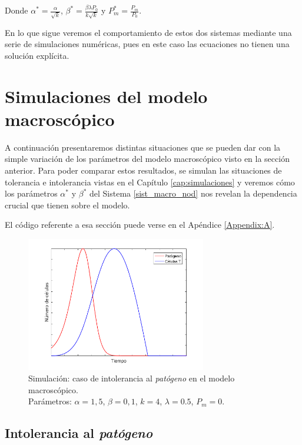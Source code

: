 Donde $\alpha^{*} = \frac{\alpha}{\sqrt k}$, $\beta^{*} = \frac{\beta \lambda P_0}{k \sqrt k}$ y $P_{m}^{*} = \frac{P_m}{P_0}$.

En lo que sigue veremos el comportamiento de estos dos sistemas mediante una serie de simulaciones numéricas, pues en este caso las ecuaciones no tienen una solución explícita.

\section{Simulaciones del modelo macroscópico}

A continuación presentaremos distintas situaciones que se pueden dar con la simple variación de los parámetros del modelo macroscópico visto en la sección anterior. Para poder comparar estos resultados, se simulan las situaciones de tolerancia e intolerancia vistas en el Capítulo \ref{cap:simulaciones} y veremos cómo los parámetros $\alpha^{*}$ y $\beta^{*}$ del Sistema \ref{sist_macro_nod} nos revelan la dependencia crucial que tienen sobre el modelo.

El código referente a esa sección puede verse en el Apéndice \ref{Appendix:A}.

\begin{figure}[t]
	\centering
	\includegraphics[width=0.7\textwidth]{Imagenes/Simulaciones/macro_intoler}
	\caption{Simulación: caso de intolerancia al \textit{patógeno} en el modelo macroscópico.\\Parámetros: $\alpha=1,5$, $\beta=0,1$, $k=4$, $\lambda=0.5$, $P_m = 0$.}
	\label{fig:macro_intolerance}
\end{figure}


\subsection{Intolerancia al \textit{patógeno}}

